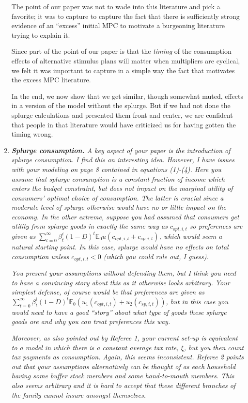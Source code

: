 \documentclass[12pt,letterpaper,english]{article}
\begin{document}
\begin{enumerate}
The point of our paper was not to wade into this literature and pick a favorite; it was to capture to capture the fact that there is sufficiently strong evidence of an ``excess'' initial MPC to motivate a burgeoning literature trying to explain it.

Since part of the point of our paper is that the \textit{timing} of the consumption effects of alternative stimulus plans will matter when multipliers are cyclical, we felt it was important to capture in a simple way the fact that motivates the excess MPC literature.

In the end, we now show that we get similar, though somewhat muted, effects in a version of the model without the splurge.  But if we had not done the splurge calculations and presented them front and center, we are confident that people in that literature would have criticized us for having gotten the timing wrong.

\item \textit{\textbf{Splurge consumption.} A key aspect of your paper is the introduction of splurge consumption. I find this an interesting idea. However, I have issues with your modeling on page 8 contained in equations (1)-(4). Here you assume that	splurge  consumption is a constant fraction of income which enters the budget constraint, but does not impact on the marginal utility of consumers' optimal choice of consumption. The latter is crucial since a moderate level of splurge otherwise would have no or little impact on the economy. In the other extreme, suppose you had assumed that consumers get utility from splurge goods in exactly the same way as $c_{opt,i,t}$ so preferences are given as $\sum_{t=0}^{\infty} \beta^i_t (1 - D)^{t} \mathbb{E}_0 u(c_{opt,i,t} + c_{sp,i,t})$, which would seem a natural starting point. In this case, splurge would have no effects on total consumption unless $c_{opt,i,t} < 0$ (which you could rule out, I guess).} 

\textit{You present your assumptions without defending them, but I think you need to have a convincing story about this as it otherwise looks arbitrary. Your simplest defense, of course would be that preferences are given as $\sum_{t=0}^{\infty} \beta^i_t (1 - D)^{t} \mathbb{E}_0\left(u_1(c_{opt,i,t}) + u_2(c_{sp,i,t})\right)$, but in this case you would need to have a good ``story'' about what type of goods these splurge goods are and why you can treat preferences this way.}

\textit{Moreover, as also pointed out by Referee 1, your current set-up is equivalent to a model in which there is a constant average tax rate, $\xi$, but you then count tax	payments as consumption. Again, this seems inconsistent. Referee 2 points out that your assumptions alternatively can be thought of as each household having some buffer stock members and some hand-to-mouth members. This also seems arbitrary and it is hard to accept that these different branches of the family cannot insure amongst themselves.}


\end{enumerate}
\end{document}
